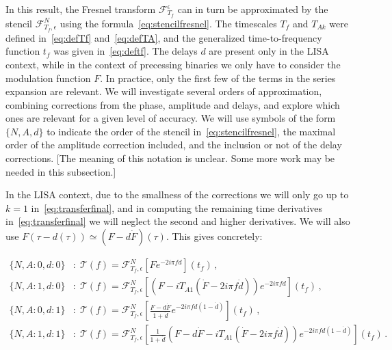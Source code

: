 \documentclass[aps,showpacs,twocolumn,
prd,superscriptaddress,nofootinbib]{revtex4-1}
\newcommand\calF{{\mathcal{F}}}
\newcommand\calT{{\mathcal{T}}}
\newcommand{\Tf}{T_{f}}
\newcommand{\jgb}[1]{{\color{DarkGreen} #1}}
\begin{document}
In this result, the Fresnel transform $\calF^{\epsilon}_{\Tf}$ can in turn be approximated by the stencil $\calF^{N}_{\Tf, \epsilon}$ using the formula~\eqref{eq:stencilfresnel}. The timescales $\Tf$ and $T_{Ak}$ were defined in~\eqref{eq:defTf} and~\eqref{eq:defTA}, and the generalized time-to-frequency function $t_{f}$ was given in~\eqref{eq:deftf}. The delays $d$ are present only in the LISA context, while in the context of precessing binaries we only have to consider the modulation function $F$. In practice, only the first few of the terms in the series expansion are relevant. We will investigate several orders of approximation, combining corrections from the phase, amplitude and delays, and explore which ones are relevant for a given level of accuracy. We will use symbols of the form $\{N,A,d\}$ to indicate the order of the stencil in~\eqref{eq:stencilfresnel}, the maximal order of the amplitude correction included, and the inclusion or not of the delay corrections. \jgb{[The meaning of this notation is unclear. Some more work may be needed in this subsection.]}

In the LISA context, due to the smallness of the corrections we will only go up to $k=1$ in~\eqref{eq:transferfinal}, and in computing the remaining time derivatives in~\eqref{eq:transferfinal} we will neglect the second and higher derivatives. We will also use $F(\tau - d(\tau)) \simeq (F - d \dot{F})(\tau)$. This gives concretely:
\begin{widetext}
\begin{subequations}\label{eq:summaryNAd}
\begin{align}
	\{N,A:0,d:0\}&: \; \calT(f) = \calF^{N}_{\Tf, \epsilon} \left[ F e^{-2i\pi f d} \right] (t_{f}) \,, \\
	\{N,A:1,d:0\}&: \; \calT(f) = \calF^{N}_{\Tf, \epsilon} \left[ \left(F - i T_{A1} \left( \dot{F} - 2i\pi f \dot{d}\right) \right) e^{-2i\pi f d} \right] (t_{f}) \,, \\
	\{N,A:0,d:1\}&: \; \calT(f) = \calF^{N}_{\Tf, \epsilon} \left[ \frac{F - d\dot{F}}{1+\dot{d}} e^{-2i\pi f d (1-\dot{d})} \right] (t_{f})\,, \\
	\{N,A:1,d:1\}&: \; \calT(f) = \calF^{N}_{\Tf, \epsilon} \left[ \frac{1}{1+\dot{d}}\left(  F - d\dot{F} - i T_{A1} \left( \dot{F} - 2i\pi f \dot{d} \right) \right) e^{-2i\pi f d (1 - \dot{d})} \right] (t_{f})\,.
\end{align}
\end{subequations}
\end{widetext}
\end{document}
